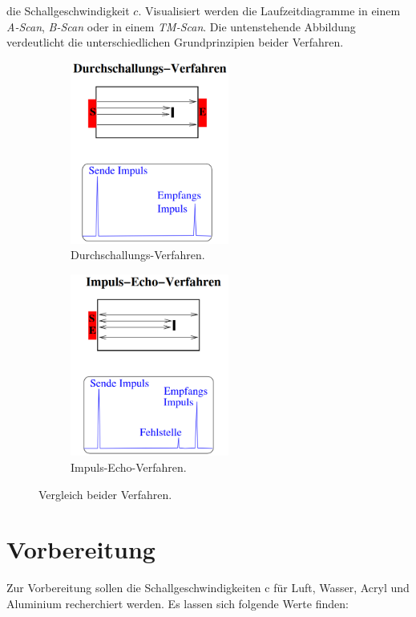 \noindent die Schallgeschwindigkeit $c$. Visualisiert werden die Laufzeitdiagramme in einem \emph{A-Scan}, \emph{B-Scan} oder in 
einem \emph{TM-Scan}. Die untenstehende Abbildung verdeutlicht die unterschiedlichen Grundprinzipien beider Verfahren.

\begin{figure}
    \begin{subfigure}{0.48\textwidth}
        \centering
        \includegraphics[height=6cm]{content/Durchschallung.png}
        \caption{Durchschallungs-Verfahren.}
        \label{fig:DSV}
    \end{subfigure}
    \hfill
    \begin{subfigure}{0.48\textwidth}
        \centering 
        \includegraphics[height=6cm]{content/Impuls_Echo.png}
        \caption{Impuls-Echo-Verfahren.}
        \label{fig:IEV}
    \end{subfigure}
    \caption{Vergleich beider Verfahren\cite{Versuchsanleitung_US1}.}
    \label{fig:Vergleich}
\end{figure}

\section{Vorbereitung}
Zur Vorbereitung sollen die Schallgeschwindigkeiten c für Luft, Wasser, Acryl und Aluminium recherchiert werden. Es 
lassen sich folgende Werte finden:

